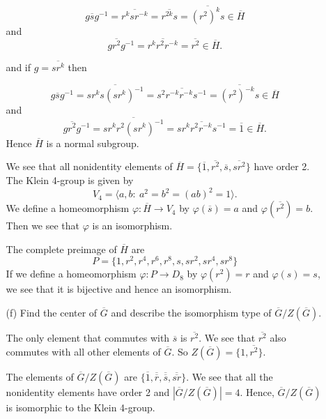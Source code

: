 \documentclass[12pt]{article}
\begin{document}
\begin{enumerate}
\begin{enumerate}
\begin{mybox}
    
        $$g\overline{s}g^{-1}=\overline{r^ksr^{-k}}=
        \overline{r^{2k}s}=\overline{(r^2)^ks}\in
        \overline{H}$$
        and  $$g\overline{r^2}g^{-1}=\overline{r^kr^2r^{-k}}=
        \overline{r^{2}}\in
        \overline{H}.$$
        
        and if $g=\overline{sr^k}$ then

        $$g\overline{s}g^{-1}=\overline{sr^ks(sr^k)^{-1}}=
        \overline{s^2r^{-k}r^{-k}s^{-1}}=
        \overline{(r^2)^{-k}s}\in \overline{H}$$
        and
        $$g\overline{r^2}g^{-1}=
        \overline{sr^kr^2(sr^k)^{-1}}=
        \overline{sr^kr^2r^{-k}s^{-1}}=\overline{1}\in
        \overline{H}.$$
        Hence $\overline{H}$ is a normal subgroup.

        \vspace*{2mm}
    We see that all nonidentity elements of $\overline{H}
    =\{\overline{1}, \overline{r^2},
    \overline{s}, \overline{sr^2}\}$ have order 2.
    The Klein 4-group is given by
    $$V_4=\langle a,b:\ a^2=b^2=(ab)^2=1\rangle.$$
    We define a homeomorphism $\varphi:\overline{H}
    \to V_4$ by $\varphi(\overline{s})=a$ and
    $\varphi(\overline{r^2})=b$. Then we see that
    $\varphi$ is an isomorphism.

    \vspace*{3mm}
    The complete preimage of $\overline{H}$ are
    $$P= \{1, r^2, r^4, r^6, r^8, s, sr^2, sr^4, sr^8\}$$
    If we define a homeomorphism
    $\varphi:P\to D_8$ by
    $\varphi(r^2)=r$ and $\varphi(s)=s$, we see that it
    is bijective and hence an isomorphism.

\end{mybox}

\item[(f)] Find the center of $\overline{G}$ and describe
the isomorphism type
of $\overline{G}/Z(\overline{G})$.
\begin{mybox}
    
    The only element that commutes with $\overline{s}$
    is $\overline{r^2}$. We see that $\overline{r^2}$
    also commutes with all other elements of
    $\overline{G}$. So $Z(\overline{G})=\{ 1,
    \overline{r^2}\}$.

    \vspace*{3mm}
    The elements of $\overline{G}/Z(\overline{G})$ are
    $\{\overline{1}, \overline{\overline{r}},
    \overline{\overline{s}},\overline{\overline{sr}}\}$.
    We see that all the nonidentity elements have order
    2 and $|\overline{G}/Z(\overline{G})|=4$. Hence,
    $\overline{G}/Z(\overline{G})$ is isomorphic to
    the Klein 4-group.
\end{mybox}


\end{enumerate}
\end{enumerate}
\end{document}
